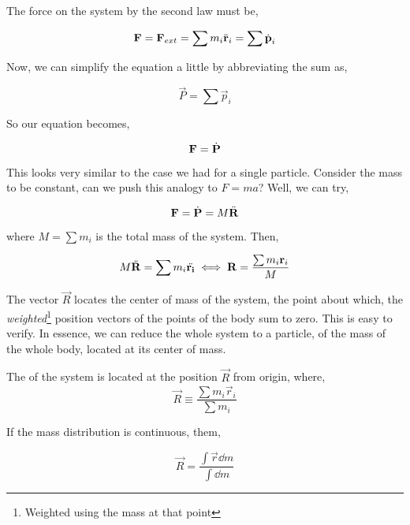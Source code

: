 The force on the system by the second law must be, 

\begin{equation*}
    \boldsymbol{\mathbf{F}} = \boldsymbol{\mathbf{F}}_{ext} = \sum m_i\ddot{\boldsymbol{\mathbf{r}}}_i = \sum \dot{\boldsymbol{\mathbf{p}}}_i
\end{equation*}

Now, we can simplify the equation a little by abbreviating the sum as, 

\begin{equation}
    \vec{P} = \sum \vec{p}_i
\end{equation}

So our equation becomes, 

\begin{equation}
    \boldsymbol{\mathbf{F}} = \dot{\boldsymbol{\mathbf{P}}}
\end{equation}

This looks very similar to the case we had for a single particle. Consider the mass to 
be constant, can we push this analogy to \(F = ma\)? Well, we can try,

\begin{equation*}
    \boldsymbol{\mathbf{F}} = \dot{\boldsymbol{\mathbf{P}}} = M\ddot{\boldsymbol{\mathbf{R}}}
\end{equation*}

where \(M = \sum m_i\) is the total mass of the system. Then,

\begin{equation*}
    M\ddot{\boldsymbol{\mathbf{R}}} = \sum m_i \ddot{\boldsymbol{\mathbf{r_i}}} \iff \boldsymbol{\mathbf{R}} = \frac{\sum m_i \boldsymbol{\mathbf{r}}_i}{M}
\end{equation*}

The vector \(\vec{R}\) locates the center of mass of the system, the point about which, 
the \emph{weighted}\footnote{Weighted using the mass at that point} position vectors 
of the points of the body sum to zero. This is easy to verify. In essence, we can reduce the 
whole system to a particle, of the mass of the whole body, located at its center of mass.

\begin{definition}
    The  of the system is located at the position \(\vec{R}\) from origin, where,
    \begin{equation}
        \vec{R} \equiv \frac{\sum m_i \vec{r}_i}{\sum m_i}
    \end{equation}
\end{definition}


If the mass distribution is continuous, them,

\begin{equation}
    \vec{R} = \frac{\int \vec{r} \dd{m}}{\int \dd{m}}
\end{equation}

